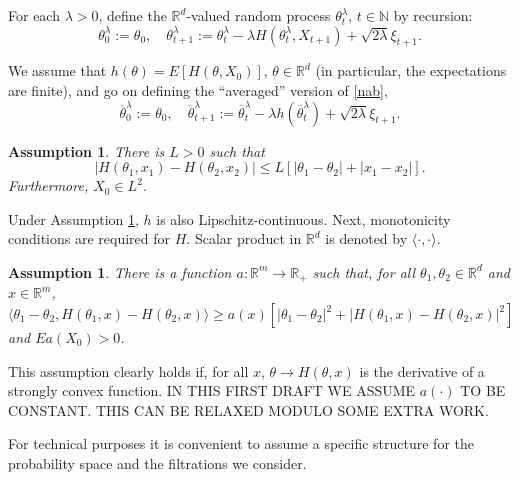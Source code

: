 \documentclass[a4paper,draft]{article}
\newtheorem{assumption}[theorem]{Assumption}
\begin{document}
For each $\lambda>0$, define the $\mathbb{R}^d$-valued 
random process $\theta^{\lambda}_t$, $t\in\mathbb{N}$ by recursion:
\begin{equation}\label{nab}
\theta^{\lambda}_0:=\theta_0,\quad \theta^{\lambda}_{t+1}:=\theta^{\lambda}_t-\lambda H(\theta^{\lambda}_t,X_{t+1})+\sqrt{2\lambda}\xi_{t+1}.
\end{equation}

We assume that $h(\theta)=E[H(\theta,X_0)]$, $\theta\in\mathbb{R}^d$ 
(in particular, the expectations are finite), and go on
defining the ``averaged'' version of \eqref{nab},
\begin{equation}\label{aver}
\overline{\theta}^{\lambda}_0:=\theta_0,\quad 
\overline{\theta}^{\lambda}_{t+1}:=\overline{\theta}^{\lambda}_t-\lambda 
h(\overline{\theta}^{\lambda}_t)+\sqrt{2\lambda}\xi_{t+1}.
\end{equation}

\begin{assumption}\label{lip} There is $L>0$ such that
$$
|H(\theta_1,x_1)-H(\theta_2,x_2)|\leq L[|\theta_1-\theta_2|+|x_1-x_2|].
$$
Furthermore, $X_0\in L^2$.
\end{assumption}
 
Under Assumption \ref{lip}, $h$ is also Lipschitz-continuous. Next, monotonicity conditions are required for $H$. Scalar product in $\mathbb{R}^d$
is denoted by $\langle \cdot,\cdot\rangle$.

\begin{assumption}\label{diss} There is a function $a:\mathbb{R}^m\to\mathbb{R}_+$ such that, for all $\theta_1,\theta_2\in\mathbb{R}^d$ and $x\in\mathbb{R}^m$,
\begin{equation}\label{montre}
\langle \theta_1-\theta_2,H(\theta_1,x)-H(\theta_2,x)\rangle\geq 
a(x)[|\theta_1-\theta_2|^2 + |H(\theta_1,x)-H(\theta_2,x)|^2]
\end{equation}
and $Ea(X_0)>0$.
\end{assumption}

This assumption clearly holds if, for all $x$, $\theta\to H(\theta,x)$ 
is the derivative of a strongly convex function.
IN THIS FIRST DRAFT WE ASSUME $a(\cdot)$ TO BE CONSTANT. THIS CAN BE
RELAXED MODULO SOME EXTRA WORK.

For technical purposes it is convenient to assume a specific structure
for the probability space and the filtrations we consider.
\end{document}
